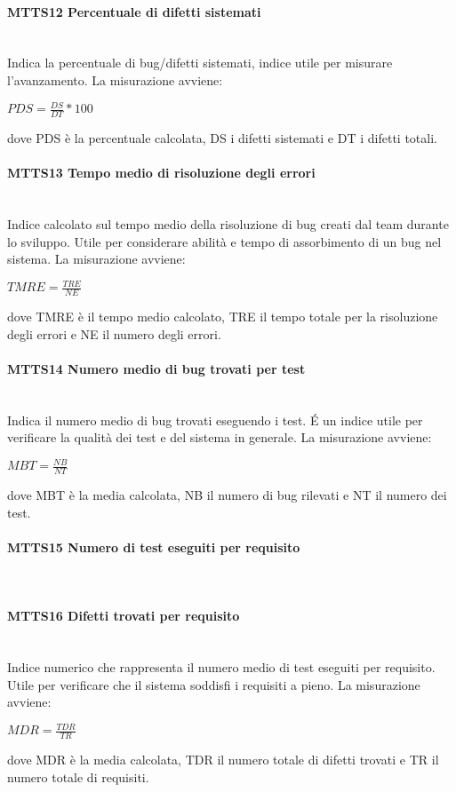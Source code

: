 \paragraph{MTTS12 Percentuale di difetti sistemati}\-\\
Indica la percentuale di bug/difetti sistemati, indice utile per misurare l'avanzamento. La misurazione avviene:
\begin{center}
	\item $PDS = \frac{DS}{DT}*100$
\end{center}
dove PDS è la percentuale calcolata, DS i difetti sistemati e DT i difetti totali.

\paragraph{MTTS13 Tempo medio di risoluzione degli errori}\-\\
Indice calcolato sul tempo medio della risoluzione di bug creati dal team durante lo sviluppo. Utile per considerare abilità e tempo di assorbimento di un bug nel sistema. La misurazione avviene:
\begin{center}
	\item $TMRE = \frac{TRE}{NE}$
\end{center}
dove TMRE è il tempo medio calcolato, TRE il tempo totale per la risoluzione degli errori e NE il numero degli errori.

\paragraph{MTTS14 Numero medio di bug trovati per test}\-\\
Indica il numero medio di bug trovati eseguendo i test. \'E un indice utile per verificare la qualità dei test e del sistema in generale. La misurazione avviene:
\begin{center}
	\item $MBT = \frac{NB}{NT}$
\end{center}
dove MBT è la media calcolata, NB il numero di bug rilevati e NT il numero dei test.

\paragraph{MTTS15 Numero di test eseguiti per requisito}\-\\

\paragraph{MTTS16 Difetti trovati per requisito}\-\\
Indice numerico che rappresenta il numero medio di test eseguiti per requisito. Utile per verificare che il sistema soddisfi i requisiti a pieno. La misurazione avviene:
\begin{center}
	\item $MDR = \frac{TDR}{TR}$
\end{center}
dove MDR è la media calcolata, TDR il numero totale di difetti trovati e TR il numero totale di requisiti.


